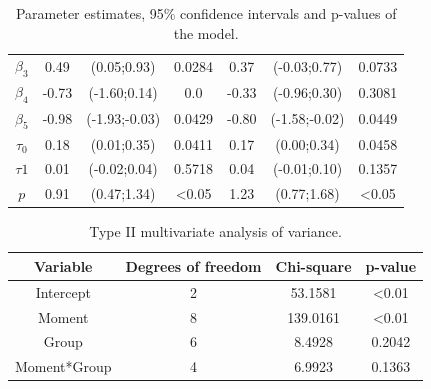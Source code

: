 \documentclass[AMA,STIX1COL]{WileyNJD-v2}
\begin{document}
\begin{table}[H]
\begin{tabular}{c|cccccc}
$\beta_3$                  & 0.49       & (0.05;0.93)                                                       & \multicolumn{1}{c|}{0.0284} & 0.37       & (-0.03;0.77)                                                      & 0.0733           \\
$\beta_4$                  & -0.73      & (-1.60;0.14)                                                      & \multicolumn{1}{c|}{0.0}            & -0.33      & (-0.96;0.30)                                                      & 0.3081           \\
$\beta_5$                  & -0.98      & (-1.93;-0.03)                                                     & \multicolumn{1}{c|}{0.0429} & -0.80      & (-1.58;-0.02)                                                     & 0.0449 \\
$\tau_0$                   & 0.18       & (0.01;0.35)                                                       & \multicolumn{1}{c|}{0.0411} & 0.17       & (0.00;0.34)                                                       & 0.0458           \\
$\tau1$                    & 0.01       & (-0.02;0.04)                                                      & \multicolumn{1}{c|}{0.5718}           & 0.04       & (-0.01;0.10)                                                      & 0.1357           \\
$p$                        & 0.91       & (0.47;1.34)                                                       & \multicolumn{1}{c|}{\textless 0.05} & 1.23       & (0.77;1.68)                                                       & \textless 0.05 \\ \hline
\end{tabular}
\caption{Parameter estimates, 95\% confidence intervals and p-values of the model.}
\label{tab3}
\end{table}

\begin{table}[H]
\centering
\begin{tabular}{cccc}
\hline
Variable      & Degrees of freedom & Chi-square   & p-value        \\ \hline
Intercept     & 2                  & 53.1581      & \textless 0.01 \\
Moment        & 8                  & 139.0161     & \textless 0.01 \\
Group         & 6                  & 8.4928       & 0.2042         \\
Moment*Group  & 4                  & 6.9923       & 0.1363         \\ \hline
\end{tabular}
\caption{Type II multivariate analysis of variance.}
\label{tab4}
\end{table}
\end{document}
